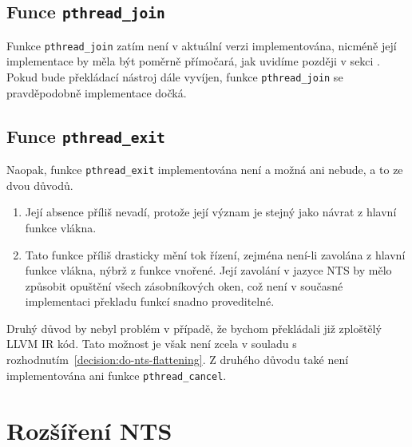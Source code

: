 \documentclass{fithesis2}
\begin{document}
\subsection{Funce \texttt{pthread\_join}}
Funkce \texttt{pthread\_join} zatím není v aktuální verzi implementována, nicméně její implementace by měla být poměrně přímočará, jak uvidíme později v sekci . Pokud bude překládací nástroj dále vyvíjen, funkce \texttt{pthread\_join} se pravděpodobně implementace dočká.

\subsection{Funce \texttt{pthread\_exit}}
Naopak, funkce \texttt{pthread\_exit} implementována není a možná ani nebude, a to ze dvou důvodů.
\begin{enumerate}
\item Její absence příliš nevadí, protože její význam je stejný jako návrat z hlavní funkce vlákna.
\item Tato funkce příliš drasticky mění tok řízení, zejména není-li zavolána z hlavní funkce vlákna, nýbrž z funkce vnořené. Její zavolání v jazyce NTS by mělo způsobit opuštění všech zásobníkových oken, což není v současné implementaci překladu funkcí snadno proveditelné.
\end{enumerate}
Druhý důvod by nebyl problém v případě, že bychom překládali již zploštělý LLVM IR kód. Tato možnost je však není zcela v souladu s rozhodnutím~\ref{decision:do-nts-flattening}. Z druhého důvodu také není implementována ani funkce \texttt{pthread\_cancel}.

\section{Rozšíření NTS}
\label{sec:nts-extensions}
\end{document}
